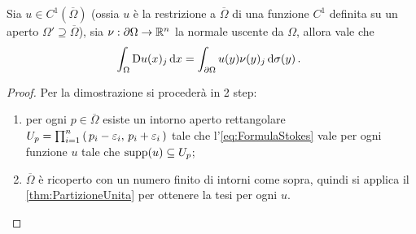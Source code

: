 \begin{theorem}\label{thm:Stokes}
	Sia $u\in C^1(\overline\Omega)$ (ossia $u$ è la restrizione a $\overline\Omega$ di una funzione $C^1$ definita su un aperto
	$\Omega'\supseteq \overline\Omega$), sia $\nu:\partial \Omega \rightarrow \mathbb R^n$ la normale uscente da $\Omega$, allora vale che
	\begin{equation}\label{eq:FormulaStokes}
		\int_{\Omega} \mathrm D u(x)_j \,\mathrm d x = \int_{\partial \Omega} u(y)\nu(y)_j \,\mathrm d \sigma(y)\, \text{. }
	\end{equation}
\end{theorem}

\begin{proof}
	Per la dimostrazione si procederà in 2 step:
	\begin{enumerate}
		\item per ogni $p\in \overline\Omega$ esiste un intorno aperto rettangolare $U_p=\prod_{i=1}^n \left(\,p_i-\varepsilon_i,\,p_i+\varepsilon_i\,\right)$
			tale che l'\cref{eq:FormulaStokes} vale per ogni funzione $u$ tale che $\operatorname{supp}(u)\subseteq U_p$;
		\item $\overline\Omega$ è ricoperto con un numero finito di intorni come sopra, quindi si applica il \cref{thm:PartizioneUnita} per ottenere
			la tesi per ogni $u$.
	\end{enumerate}
	

\end{proof}
